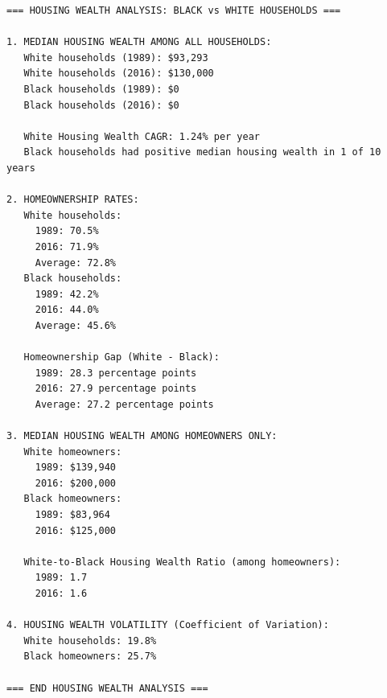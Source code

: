 \documentclass[
  letterpaper,
  DIV=11,
  numbers=noendperiod]{scrartcl}
\begin{document}
\begin{verbatim}
=== HOUSING WEALTH ANALYSIS: BLACK vs WHITE HOUSEHOLDS ===

1. MEDIAN HOUSING WEALTH AMONG ALL HOUSEHOLDS:
   White households (1989): $93,293
   White households (2016): $130,000
   Black households (1989): $0
   Black households (2016): $0

   White Housing Wealth CAGR: 1.24% per year
   Black households had positive median housing wealth in 1 of 10 years

2. HOMEOWNERSHIP RATES:
   White households:
     1989: 70.5%
     2016: 71.9%
     Average: 72.8%
   Black households:
     1989: 42.2%
     2016: 44.0%
     Average: 45.6%

   Homeownership Gap (White - Black):
     1989: 28.3 percentage points
     2016: 27.9 percentage points
     Average: 27.2 percentage points

3. MEDIAN HOUSING WEALTH AMONG HOMEOWNERS ONLY:
   White homeowners:
     1989: $139,940
     2016: $200,000
   Black homeowners:
     1989: $83,964
     2016: $125,000

   White-to-Black Housing Wealth Ratio (among homeowners):
     1989: 1.7
     2016: 1.6

4. HOUSING WEALTH VOLATILITY (Coefficient of Variation):
   White households: 19.8%
   Black homeowners: 25.7%

=== END HOUSING WEALTH ANALYSIS ===
\end{verbatim}
\end{document}
